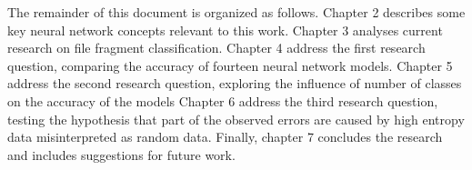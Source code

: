 
The remainder of this document is organized as follows.
    Chapter 2 describes some key neural network concepts relevant to this work. 
    Chapter 3 analyses current research on file fragment classification.
    Chapter 4 address the first research question, comparing the accuracy of fourteen neural network models.
    Chapter 5 address the second research question, exploring the influence of number of classes on the accuracy of the models
    Chapter 6 address the third research question, testing the hypothesis that part of the observed errors are caused by high entropy data misinterpreted as random data.    
    Finally, chapter 7 concludes the research and includes suggestions for future work.